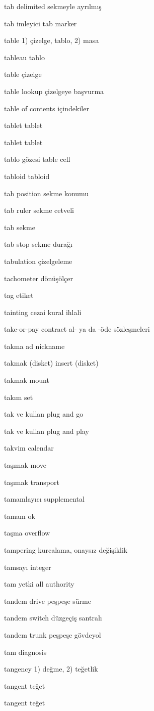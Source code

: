 \documentclass[12pt,fleqn]{article}\usepackage{../../common}
\begin{document}
tab delimited sekmeyle ayrılmış

tab imleyici tab marker

table 1) çizelge, tablo, 2) masa

tableau tablo

table çizelge

table lookup çizelgeye başvurma

table of contents içindekiler

tablet tablet

tablet tablet

tablo gözesi table cell

tabloid tabloid

tab position sekme konumu

tab ruler sekme cetveli

tab sekme

tab stop sekme durağı

tabulation çizelgeleme

tachometer dönüşölçer

tag etiket

tainting cezai kural ihlali

take-or-pay contract al- ya da -öde sözleşmeleri

takma ad nickname

takmak (disket) insert (disket)

takmak mount

takım set

tak ve kullan plug and go

tak ve kullan plug and play

takvim calendar

taşımak move

taşımak transport

tamamlayıcı supplemental

tamam ok

taşma overflow

tampering kurcalama, onaysız değişiklik

tamsayı integer

tam yetki all authority

tandem drive peşpeşe sürme

tandem switch düzgeçiş santralı

tandem trunk peşpeşe gövdeyol

tanı diagnosis

tangency 1) değme, 2) teğetlik

tangent teğet

tangent teğet
\end{document}

